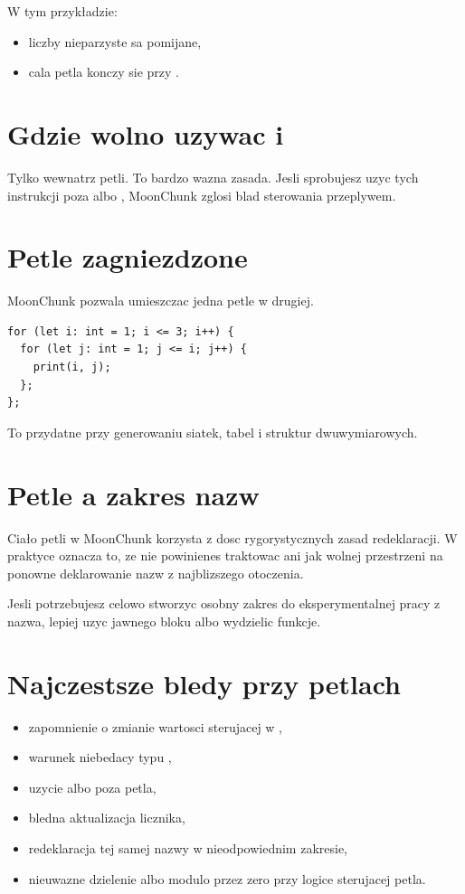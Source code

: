 W tym przykładzie:

\begin{itemize}
  \item liczby nieparzyste sa pomijane,
  \item cala petla konczy sie przy .
\end{itemize}

\section{Gdzie wolno uzywac  i }
Tylko wewnatrz petli. To bardzo wazna zasada. Jesli sprobujesz uzyc tych instrukcji
poza  albo , MoonChunk zglosi blad sterowania przeplywem.

\section{Petle zagniezdzone}
MoonChunk pozwala umieszczac jedna petle w drugiej.

\begin{lstlisting}[style=moonchunk,caption={Petle zagniezdzone}]
for (let i: int = 1; i <= 3; i++) {
  for (let j: int = 1; j <= i; j++) {
    print(i, j);
  };
};
\end{lstlisting}

To przydatne przy generowaniu siatek, tabel i struktur dwuwymiarowych.

\section{Petle a zakres nazw}
Ciało petli w MoonChunk korzysta z dosc rygorystycznych zasad redeklaracji. W praktyce
oznacza to, ze nie powinienes traktowac  ani  jak wolnej przestrzeni
na ponowne deklarowanie nazw z najblizszego otoczenia.

Jesli potrzebujesz celowo stworzyc osobny zakres do eksperymentalnej pracy z nazwa,
lepiej uzyc jawnego bloku  albo wydzielic funkcje.

\section{Najczestsze bledy przy petlach}
\begin{itemize}
  \item zapomnienie o zmianie wartosci sterujacej w ,
  \item warunek niebedacy typu ,
  \item uzycie  albo  poza petla,
  \item bledna aktualizacja licznika,
  \item redeklaracja tej samej nazwy w nieodpowiednim zakresie,
  \item nieuwazne dzielenie albo modulo przez zero przy logice sterujacej petla.
\end{itemize}

